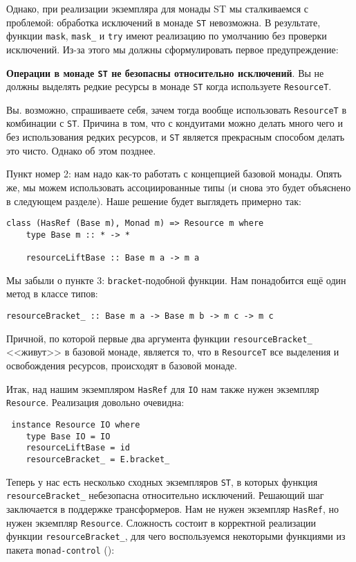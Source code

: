 Однако, при реализации экземпляра для монады ST мы сталкиваемся с проблемой:
обработка исключений в 
монаде \lstinline{ST} невозможна. В результате, функции \lstinline'mask',
\lstinline'mask_' и \lstinline'try' имеют
реализацию по умолчанию без проверки исключений. Из-за этого мы должны сформулировать первое
предупреждение:

\textbf{Операции в монаде \lstinline{ST} не безопасны относительно исключений}. Вы не должны выделять
редкие ресурсы в монаде \lstinline{ST} когда используете \lstinline'ResourceT'.

Вы. возможно, спрашиваете себя, зачем тогда вообще использовать \verb'ResourceT' в комбинации с \verb'ST'. Причина в том, что с кондуитами можно делать много чего и без использования редких ресурсов, и \verb'ST' является прекрасным способом делать это чисто. Однако об этом позднее.

Пункт номер 2: нам надо как-то работать с концепцией базовой монады. Опять же, мы можем
использовать ассоциированные типы (и снова это будет объяснено в следующем разделе). 
Наше решение будет выглядеть примерно так:
\begin{lstlisting}
class (HasRef (Base m), Monad m) => Resource m where
    type Base m :: * -> *

    resourceLiftBase :: Base m a -> m a 
\end{lstlisting}

Мы забыли о пункте 3: \verb'bracket'-подобной функции. Нам понадобится ещё один метод в классе
типов:
\begin{lstlisting}
resourceBracket_ :: Base m a -> Base m b -> m c -> m c 
\end{lstlisting}
Причной, по которой первые два аргумента функции \lstinline'resourceBracket_' <<живут>> в
базовой монаде, является то, что в \lstinline'ResourceT' все выделения и освобождения
ресурсов, происходят в базовой монаде.

Итак, над нашим экземпляром \lstinline'HasRef' для \lstinline'IO' нам также нужен экземпляр
\lstinline'Resource'. Реализация довольно очевидна:
\begin{lstlisting}
 instance Resource IO where
    type Base IO = IO
    resourceLiftBase = id
    resourceBracket_ = E.bracket_
\end{lstlisting}

Теперь у нас есть несколько сходных экземпляров \lstinline'ST', в которых функция
\lstinline'resourceBracket_' небезопасна относительно исключений. Решающий шаг заключается
в поддержке трансформеров. Нам не нужен
экземпляр \lstinline'HasRef', но нужен экземпляр \lstinline'Resource'.
Сложность состоит в корректной реализации функции \lstinline'resourceBracket_', для чего
воспользуемся некоторыми функциями из пакета \texttt{monad-control}
():

